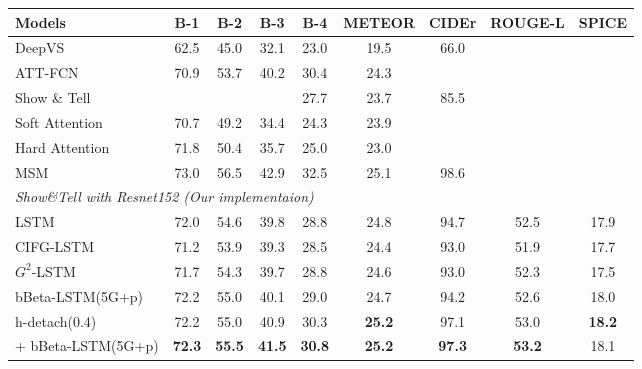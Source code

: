 \documentclass[letterpaper]{article} %
\begin{document}
%
\begin{table}[h!]
	\centering
	\begin{tabular}{lcccccccc}
		\toprule
		\textbf{Models} & \textbf{B-1} & \textbf{B-2} & \textbf{B-3} & \textbf{B-4} & \textbf{METEOR} & \textbf{CIDEr} & \textbf{ROUGE-L} & \textbf{SPICE}\\
		\midrule
		DeepVS~\cite{karpathy2015deep} &62.5 & 45.0 & 32.1 & 23.0 & 19.5 & 66.0& {\textemdash}& {\textemdash} \\
		ATT-FCN~\cite{you2016image} & 70.9 & 53.7 & 40.2 & 30.4 & 24.3 & {\textemdash}& {\textemdash}& {\textemdash}\\
		Show \& Tell~\cite{vinyals2015show} & {\textemdash}  & {\textemdash}    & {\textemdash} & 27.7 & 23.7 & 85.5 & {\textemdash}& {\textemdash}\\
		Soft Attention~\cite{xu2015show}  & 70.7 & 49.2 & 34.4 & 24.3 & 23.9 & {\textemdash}& {\textemdash}& {\textemdash}\\
		Hard Attention~\cite{xu2015show}  & 71.8 & 50.4 & 35.7 & 25.0 & 23.0 & {\textemdash}& {\textemdash}& {\textemdash}\\
		MSM~\cite{yao2017boosting} & 73.0 & 56.5 & 42.9 & 32.5 & 25.1 & 98.6 & {\textemdash}& {\textemdash}\\
		\midrule
		\multicolumn{7}{l}{\emph{Show\&Tell with Resnet152 (Our implementaion)}}& {\textemdash}& {\textemdash}\\
		\hspace{10pt}LSTM & 72.0 & 54.6 & 39.8 & 28.8 & 24.8 &  94.7& 52.5& 17.9\\
		\hspace{10pt}CIFG-LSTM & 71.2 & 53.9 & 39.3 & 28.5 & 24.4 & 93.0& 51.9& 17.7\\
		\hspace{10pt}$G^{2}$-LSTM & 71.7 & 54.3 & 39.7 & 28.8 & 24.6 & 93.0& 52.3& 17.5\\
		\hspace{10pt}bBeta-LSTM(5G+p) &  72.2 &  55.0 &  40.1 &  29.0 & 24.7 & 94.2& 52.6& 18.0\\
		\hspace{10pt}h-detach(0.4)~\cite{hdetach2019} & 72.2 & 55.0 & 40.9 & 30.3 & \bfseries 25.2 & 97.1 & 53.0& \bfseries 18.2\\
		\hspace{10pt}\hspace{1pt} + bBeta-LSTM(5G+p)  & \bfseries 72.3 & \bfseries 55.5 & \bfseries 41.5 & \bfseries 30.8 & \bfseries 25.2 & \bfseries 97.3 & \bfseries 53.2&  18.1\\

\end{tabular}
\end{table}
\end{document}
